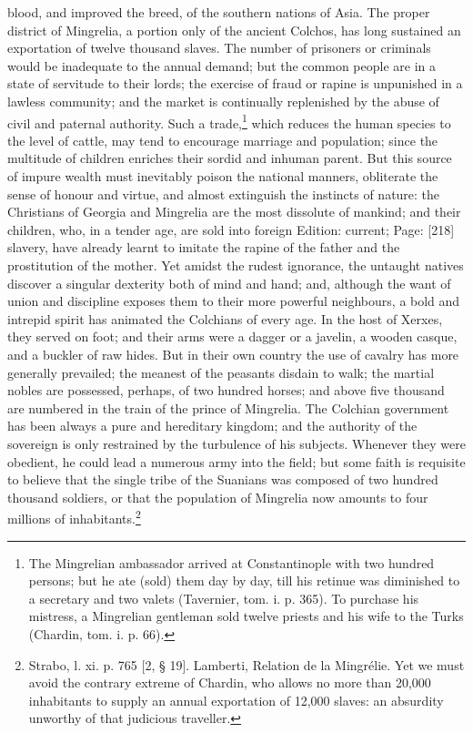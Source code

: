 blood, and improved the breed, of the southern nations of Asia. The proper district of Mingrelia, a portion only of the ancient Colchos, has long sustained an exportation of twelve thousand slaves. The number of prisoners or criminals would be inadequate to the annual demand; but the common people are in a state of servitude to their lords; the exercise of fraud or rapine is unpunished in a lawless community; and the market is continually replenished by the abuse of civil and paternal authority. Such a trade,\footnote{The Mingrelian ambassador arrived at Constantinople with two hundred persons; but he ate (sold) them day by day, till his retinue was diminished to a secretary and two valets (Tavernier, tom. i. p. 365). To purchase his mistress, a Mingrelian gentleman sold twelve priests and his wife to the Turks (Chardin, tom. i. p. 66).} which reduces the human species to the level of cattle, may tend to encourage marriage and population; since the multitude of children enriches their sordid and inhuman parent. But this source of impure wealth must inevitably poison the national manners, obliterate the sense of honour and virtue, and almost extinguish the instincts of nature: the Christians of Georgia and Mingrelia are the most dissolute of mankind; and their children, who, in a tender age, are sold into foreign Edition: current; Page: [218] slavery, have already learnt to imitate the rapine of the father and the prostitution of the mother. Yet amidst the rudest ignorance, the untaught natives discover a singular dexterity both of mind and hand; and, although the want of union and discipline exposes them to their more powerful neighbours, a bold and intrepid spirit has animated the Colchians of every age. In the host of Xerxes, they served on foot; and their arms were a dagger or a javelin, a wooden casque, and a buckler of raw hides. But in their own country the use of cavalry has more generally prevailed; the meanest of the peasants disdain to walk; the martial nobles are possessed, perhaps, of two hundred horses; and above five thousand are numbered in the train of the prince of Mingrelia. The Colchian government has been always a pure and hereditary kingdom; and the authority of the sovereign is only restrained by the turbulence of his subjects. Whenever they were obedient, he could lead a numerous army into the field; but some faith is requisite to believe that the single tribe of the Suanians was composed of two hundred thousand soldiers, or that the population of Mingrelia now amounts to four millions of inhabitants.\footnote{Strabo, l. xi. p. 765 [2, § 19]. Lamberti, Relation de la Mingrélie. Yet we must avoid the contrary extreme of Chardin, who allows no more than 20,000 inhabitants to supply an annual exportation of 12,000 slaves: an absurdity unworthy of that judicious traveller.}

